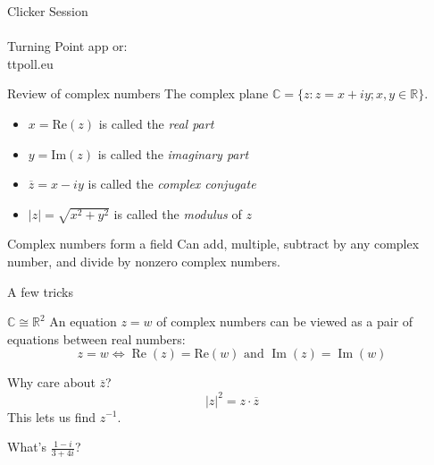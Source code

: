\documentclass{beamer}
\newcommand{\C}{\mathbb{C}}
\newcommand{\R}{\mathbb{R}}
\DeclareMathOperator{\Real}{Re}
\DeclareMathOperator{\Imag}{Im}
\begin{document}
\begin{frame}[plain,c]

\begin{center}

\Huge

Clicker Session \\
\\
Turning Point app or:
\\
ttpoll.eu 

\end{center}





\end{frame}

\begin{frame}{Review of complex numbers}
  The complex plane $\C=\{z: z=x+iy; x,y\in\R\}$.
  \begin{itemize}
  \item $x=\text{Re}(z)$ is called the \emph{real part} 
  \item $y=\text{Im}(z)$ is called the \emph{imaginary part} 
  \item $\overline{z}=x-iy$ is called the \emph{complex conjugate} 
  \item $|z|=\sqrt{x^2+y^2}$ is called the \emph{modulus} of $z$

  \end{itemize}
  \begin{block}{Complex numbers form a field}
Can add, multiple, subtract by any complex number, and divide by nonzero complex numbers.
\end{block}

\end{frame}

\begin{frame}{A few tricks}
  \begin{block}{$\C\cong\R^2$}
    An equation $z=w$ of complex numbers can be viewed as a pair of equations between real numbers:
$$z=w \iff  \Real(z)=\text{Re}(w) \text{ and } \Imag(z)=\Imag(w)$$
  \end{block}

  \begin{block}{Why care about $\overline{z}$?}
    $$|z|^2=z\cdot \overline{z}$$
    This lets us find $z^{-1}$.
\end{block}
  \begin{example}What's $\frac{1-i}{3+4i}$?

    \end{example}

\end{frame}
\end{document}
